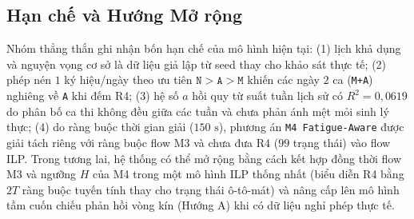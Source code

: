 \subsection{Hạn chế và Hướng Mở rộng}
Nhóm thẳng thắn ghi nhận bốn hạn chế của mô hình hiện tại: (1) lịch khả dụng và nguyện vọng cơ sở là dữ liệu giả lập từ seed thay cho khảo sát thực tế; (2) phép nén $1$ ký hiệu/ngày theo ưu tiên $\texttt{N} > \texttt{A} > \texttt{M}$ khiến các ngày $2$ ca (\texttt{M+A}) nghiêng về \texttt{A} khi đếm R4; (3) hệ số $a$ hồi quy từ suất tuần lịch sử có $R^2 = 0{,}0619$ do phân bố ca thi không đều giữa các tuần và chưa phản ánh mệt mỏi sinh lý thực; (4) do ràng buộc thời gian giải ($150\text{ s}$), phương án \texttt{M4 Fatigue-Aware} được giải tách riêng với ràng buộc flow M3 và chưa đưa R4 ($99$ trạng thái) vào flow ILP. Trong tương lai, hệ thống có thể mở rộng bằng cách kết hợp đồng thời flow M3 và ngưỡng $H$ của M4 trong một mô hình ILP thống nhất (biểu diễn R4 bằng $2T$ ràng buộc tuyến tính thay cho trạng thái ô-tô-mát) và nâng cấp lên mô hình tầm cuốn chiếu phản hồi vòng kín (Hướng A) khi có dữ liệu nghỉ phép thực tế.

